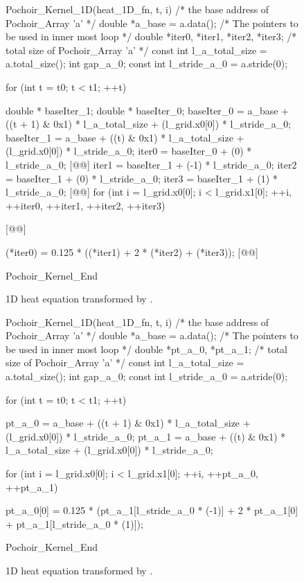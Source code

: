 \begin{figure}[t]
\begin{center-code}
\lstset{language=Pochoir_bf}
\begin{pochoir-listing}
Pochoir_Kernel_1D(heat_1D_fn, t, i)
/* the base address of Pochoir_Array 'a' */
double *a_base = a.data();
/* The pointers to be used in inner most loop */
double *iter0, *iter1, *iter2, *iter3;
/* total size of Pochoir_Array 'a' */
const int l_a_total_size = a.total_size();
int gap_a_0;
const int l_stride_a_0 = a.stride(0);

for (int t = t0; t < t1; ++t) {
    double * baseIter_1;
    double * baseIter_0;
    baseIter_0 = a_base + ((t + 1) & 0x1) * l_a_total_size + (l_grid.x0[0]) * l_stride_a_0;
    baseIter_1 = a_base + ((t) & 0x1) * l_a_total_size + (l_grid.x0[0]) * l_stride_a_0;
    iter0 = baseIter_0 + (0) * l_stride_a_0; [@\label{li:pointer:inc:begin}@]
    iter1 = baseIter_1 + (-1) * l_stride_a_0;
    iter2 = baseIter_1 + (0) * l_stride_a_0;
    iter3 = baseIter_1 + (1) * l_stride_a_0; [@\label{li:pointer:inc:end}@]
    for (int i = l_grid.x0[0]; i < l_grid.x1[0]; ++i, ++iter0, ++iter1, ++iter2, ++iter3) { [@\label{li:pointer:pp}@]

    (*iter0) = 0.125 * ((*iter1) + 2 * (*iter2) + (*iter3)); [@\label{li:pointer:term}@]
    } 
}
Pochoir_Kernel_End
\end{pochoir-listing}
\end{center-code}
\caption{1D heat equation transformed by .}
\label{fig:1DHeat-pointer}
\end{figure}

\begin{figure}[t]
\begin{center-code}
\lstset{language=Pochoir_bf}
\begin{pochoir-listing}
Pochoir_Kernel_1D(heat_1D_fn, t, i)
/* the base address of Pochoir_Array 'a' */
double *a_base = a.data();
/* The pointers to be used in inner most loop */
double *pt_a_0, *pt_a_1;
/* total size of Pochoir_Array 'a' */
const int l_a_total_size = a.total_size();
int gap_a_0;
const int l_stride_a_0 = a.stride(0);

for (int t = t0; t < t1; ++t) {
    pt_a_0 = a_base + ((t + 1) & 0x1) * l_a_total_size + (l_grid.x0[0]) * l_stride_a_0;
    pt_a_1 = a_base + ((t) & 0x1) * l_a_total_size + (l_grid.x0[0]) * l_stride_a_0;

    for (int i = l_grid.x0[0]; i < l_grid.x1[0]; ++i, ++pt_a_0, ++pt_a_1) {

    pt_a_0[0] = 0.125 * (pt_a_1[l_stride_a_0 * (-1)] + 2 * pt_a_1[0] + pt_a_1[l_stride_a_0 * (1)]);
    } 
}
Pochoir_Kernel_End
\end{pochoir-listing}
\end{center-code}
\caption{1D heat equation transformed by .}
\label{fig:1DHeat-opt-pointer}
\end{figure}

